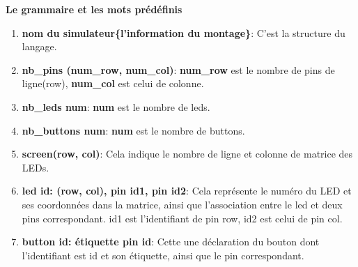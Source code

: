 \documentclass[14px]{article}
\begin{document}
\textbf{Le grammaire et les mots prédéfinis}
\begin{enumerate}
	\item \textbf{nom du simulateur\{l'information du montage\}}: C'est la structure du langage.
	\item \textbf{nb\_pins (num\_row, num\_col)}: \textbf{num\_row} est le nombre de pins de ligne(row), \textbf{num\_col} est celui de colonne.
	\item \textbf{nb\_leds num}: \textbf{num} est le nombre de leds.
	\item \textbf{nb\_buttons num}: \textbf{num} est le nombre de buttons.
	\item \textbf{screen(row, col)}: Cela indique le nombre de ligne et colonne de matrice des LEDs.
	\item \textbf{led id: (row, col), pin id1, pin id2}: Cela représente le numéro du LED et ses coordonnées dans la matrice, ainsi que l'association entre le led et deux pins correspondant. id1 est l'identifiant de pin row, id2 est celui de pin col.
	\item \textbf{button id: étiquette pin id}: Cette une déclaration du bouton dont l'identifiant est id et son étiquette, ainsi que le pin correspondant.
\end{enumerate}

\clearpage
\pagestyle{fancy}
\rhead{\thepage}
\fancyfoot{}

\clearpage
\end{document}
